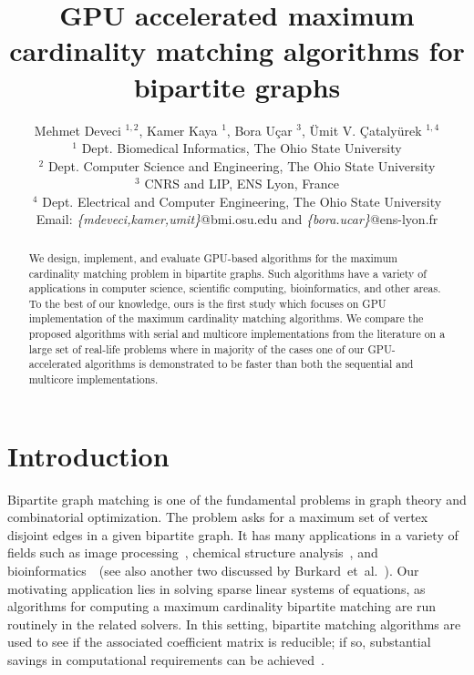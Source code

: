 \documentclass[11pt,a4paper]{article}
\begin{document}
\title{GPU accelerated maximum cardinality matching algorithms for bipartite graphs}




\author{
Mehmet Deveci $^{1,2}$,
Kamer Kaya $^{1}$,
Bora U\c car $^{3}$,
\"{U}mit V. \c{C}ataly\"{u}rek $^{1,4}$ \\
  {$^1$ Dept. Biomedical Informatics, The Ohio State University}\\
  {$^2$ Dept. Computer Science and  Engineering, The Ohio State University}\\
  {$^3$ CNRS and LIP, ENS Lyon, France}\\
  {$^4$ Dept. Electrical and Computer Engineering, The Ohio State
    University}\\
  Email: {\textit{\{mdeveci,kamer,umit\}}@bmi.osu.edu and \textit{\{bora.ucar\}}@ens-lyon.fr}\\
}





\maketitle



\begin{abstract}
We design, implement, and evaluate GPU-based algorithms for the 
maximum cardinality matching problem in bipartite graphs.
Such algorithms 
have a variety of applications in computer science, scientific
computing, bioinformatics, and other areas.
To the best of our knowledge,
ours is the first study which focuses on GPU implementation of the maximum cardinality matching algorithms.
We compare
the proposed algorithms with serial and multicore implementations
from the literature on a large set of real-life problems where in
majority of the cases one of our GPU-accelerated algorithms is demonstrated to
be faster than both the sequential and multicore implementations.
\end{abstract}

\section{Introduction}
Bipartite graph matching is one of the fundamental problems in graph theory and combinatorial optimization.
The problem asks for a maximum set of vertex disjoint edges in a given bipartite graph.
It has many applications in a variety of fields such as image processing~\cite{kika:91}, chemical structure analysis~\cite{josz:95}, and
bioinformatics~\cite{azad2012multithreaded}~(see also another two discussed by Burkard~et~al.~\cite[Section 3.8]{budm:09}). Our motivating application lies in solving sparse linear 
systems of equations, as algorithms for computing a maximum cardinality bipartite matching are run routinely in the related solvers. In this setting, bipartite matching algorithms are used to see if the associated coefficient matrix is reducible; if so, substantial savings in computational requirements can be achieved~\cite[Chapter 6]{duer:86}.
 
\end{document}

